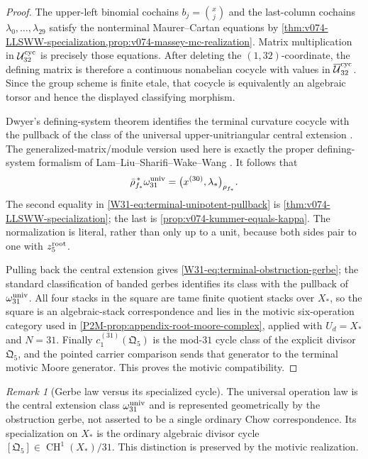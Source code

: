 \documentclass[11pt]{article}
\theoremstyle{remark}
\newtheorem{remark}[theorem]{Remark}
\providecommand{\CH}{\operatorname{CH}}
\begin{document}
\begin{proof}
The upper-left binomial cochains \(b_j=\binom{x}{j}\) and the last-column
cochains \(\lambda_0,\ldots,\lambda_{29}\) satisfy the nonterminal
Maurer--Cartan equations by
\cref{thm:v074-LLSWW-specialization,prop:v074-massey-mc-realization}.  Matrix
multiplication in \(\mathcal U_{32}^{\rm cyc}\) is precisely those equations.
After deleting the \((1,32)\)-coordinate, the defining matrix is therefore a
continuous nonabelian cocycle with values in
\(\overline{\mathcal U}_{32}^{\rm cyc}\).  Since the group scheme is finite
etale, that cocycle is equivalently an algebraic torsor and hence the displayed
classifying morphism.

Dwyer's defining-system theorem identifies the terminal curvature cocycle with
the pullback of the class of the universal upper-unitriangular central
extension \cite{DwyerMassey}.  The generalized-matrix/module version used here
is exactly the proper defining-system formalism of Lam--Liu--Sharifi--Wake--Wang
\cite{LLSWW}.  It follows that
\[
 \bar\rho_{f_*}^{\,*}\omega_{31}^{\rm univ}
 =\bigl(x^{(30)},\lambda_*\bigr)_{\rho_{f_*}}.
\]
The second equality in
\eqref{W31-eq:terminal-unipotent-pullback} is
\cref{thm:v074-LLSWW-specialization}; the last is
\cref{prop:v074-kummer-equals-kappa}.  The normalization is literal, rather
than only up to a unit, because both sides pair to one with
\(z_5^{\rm root}\).

Pulling back the central extension gives
\eqref{W31-eq:terminal-obstruction-gerbe}; the standard classification of
banded gerbes identifies its class with the pullback of
\(\omega_{31}^{\rm univ}\).  All four stacks in the square are tame finite
quotient stacks over \(X_*\), so the square is an algebraic-stack
correspondence and lies in the motivic six-operation category used in
\cref{P2M-prop:appendix-root-moore-complex}, applied with \(U_d=X_*\) and
\(N=31\).  Finally
\(c_1^{(31)}(\mathfrak Q_5)\) is the mod-\(31\) cycle class of the explicit
divisor \(\mathfrak Q_5\), and the pointed carrier comparison sends that
generator to the terminal motivic Moore generator.  This proves the motivic
compatibility.
\end{proof}

\begin{remark}[Gerbe law versus its specialized cycle]
\label{W31-rem:gerbe-law-versus-cycle}
The universal operation law is the central extension class
\(\omega_{31}^{\rm univ}\) and is represented geometrically by the obstruction
gerbe, not asserted to be a single ordinary Chow correspondence.  Its
specialization on \(X_*\) is the ordinary algebraic divisor cycle
\([\mathfrak Q_5]\in\CH^1(X_*)/31\).  This distinction is preserved by the
motivic realization.
\end{remark}
\end{document}
